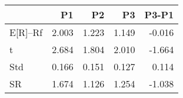 \begin{tabular}{lrrrr}
\toprule
 & P1 & P2 & P3 & P3-P1 \\
\midrule
E[R]--Rf & 2.003 & 1.223 & 1.149 & -0.016 \\
t & 2.684 & 1.804 & 2.010 & -1.664 \\
Std & 0.166 & 0.151 & 0.127 & 0.114 \\
SR & 1.674 & 1.126 & 1.254 & -1.038 \\
\bottomrule
\end{tabular}
